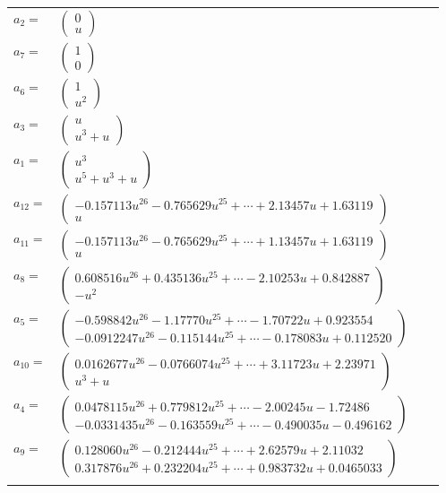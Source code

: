 \documentclass[1p]{elsarticle_modified}
\theoremstyle{definition}
\begin{document}
\begin{tabular}{m{7pt} m{180pt} m{7pt} m{180pt} }
\flushright $a_{2}=$&$\begin{pmatrix}0\\u\end{pmatrix}$ \\
\flushright $a_{7}=$&$\begin{pmatrix}1\\0\end{pmatrix}$ \\
\flushright $a_{6}=$&$\begin{pmatrix}1\\u^2\end{pmatrix}$ \\
\flushright $a_{3}=$&$\begin{pmatrix}u\\u^3+u\end{pmatrix}$ \\
\flushright $a_{1}=$&$\begin{pmatrix}u^3\\u^5+u^3+u\end{pmatrix}$ \\
\flushright $a_{12}=$&$\begin{pmatrix}-0.157113 u^{26}-0.765629 u^{25}+\cdots+2.13457 u+1.63119\\u\end{pmatrix}$ \\
\flushright $a_{11}=$&$\begin{pmatrix}-0.157113 u^{26}-0.765629 u^{25}+\cdots+1.13457 u+1.63119\\u\end{pmatrix}$ \\
\flushright $a_{8}=$&$\begin{pmatrix}0.608516 u^{26}+0.435136 u^{25}+\cdots-2.10253 u+0.842887\\- u^2\end{pmatrix}$ \\
\flushright $a_{5}=$&$\begin{pmatrix}-0.598842 u^{26}-1.17770 u^{25}+\cdots-1.70722 u+0.923554\\-0.0912247 u^{26}-0.115144 u^{25}+\cdots-0.178083 u+0.112520\end{pmatrix}$ \\
\flushright $a_{10}=$&$\begin{pmatrix}0.0162677 u^{26}-0.0766074 u^{25}+\cdots+3.11723 u+2.23971\\u^3+u\end{pmatrix}$ \\
\flushright $a_{4}=$&$\begin{pmatrix}0.0478115 u^{26}+0.779812 u^{25}+\cdots-2.00245 u-1.72486\\-0.0331435 u^{26}-0.163559 u^{25}+\cdots-0.490035 u-0.496162\end{pmatrix}$ \\
\flushright $a_{9}=$&$\begin{pmatrix}0.128060 u^{26}-0.212444 u^{25}+\cdots+2.62579 u+2.11032\\0.317876 u^{26}+0.232204 u^{25}+\cdots+0.983732 u+0.0465033\end{pmatrix}$\\&\end{tabular}
\end{document}

